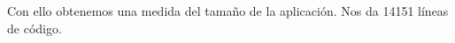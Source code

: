 \documentclass[spanish,a4paper,11pt, twoside]{report}	%
\begin{document}
\vspace{0.35cm}
\hspace{2.9cm}
\vspace{0.35cm}

Con ello obtenemos una medida del tamaño de la aplicación. Nos da 14151 líneas de código.
\end{document}
